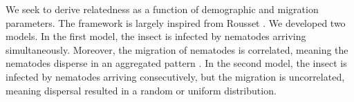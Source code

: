 \documentclass[10pt]{article}
\begin{document}
\begin{multicols}{2}
\begin{figure*}[hbt!]
\begin{mdframed}
\begin{multicols}{2}
 \end{multicols}
\end{mdframed}
\end{figure*}
We seek to derive relatedness as a function of demographic and migration parameters.
The framework is largely inspired from Rousset \cite{rousset2004genetic}.
We developed two models.
In the first model, the insect is infected by nematodes arriving simultaneously. 
Moreover, the migration of nematodes is correlated, meaning the nematodes disperse in an aggregated pattern \cite{shapiro2013aggregative}.
In the second model, the insect is infected by nematodes arriving consecutively, but the migration is uncorrelated, meaning dispersal resulted in a random or uniform distribution.

\end{multicols}
\end{document}
